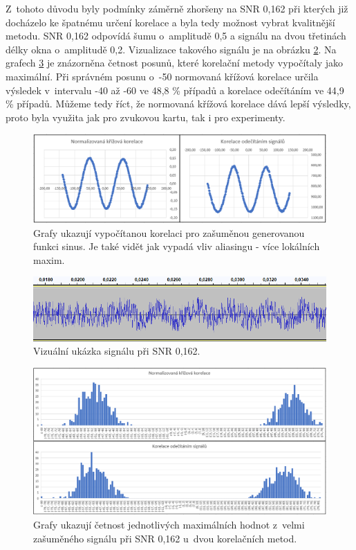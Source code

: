 Z~tohoto důvodu byly podmínky záměrně zhoršeny na SNR 0,162 při kterých již docházelo ke špatnému určení korelace a byla tedy možnost vybrat kvalitnější metodu. SNR 0,162 odpovídá šumu o~amplitudě 0,5 a signálu na dvou třetinách délky okna o~amplitudě 0,2. Vizualizace takového signálu je na obrázku \ref{pic:signalSNR01}. Na grafech \ref{pic:SNR01} je znázorněna četnost posunů, které korelační metody vypočítaly jako maximální. Při správném posunu o~-50 normovaná křížová korelace určila výsledek v~intervalu -40 až -60 ve 48,8 \% případů a korelace odečítáním ve 44,9 \% případů. Můžeme tedy říct, že normovaná křížová korelace dává lepší výsledky, proto byla využita jak pro zvukovou kartu, tak i pro experimenty.

\begin{figure}[hbt]
	\centering
	\includegraphics[width=1\textwidth]{obrazky-figures/korelSNR1.png}
	\caption{Grafy ukazují vypočítanou korelaci pro zašuměnou generovanou funkci sinus. Je také vidět jak vypadá vliv aliasingu - více lokálních maxim.}
	\label{pic:SNR1}
\end{figure}

\begin{figure}[hbt]
	\centering
	\includegraphics[width=1\textwidth]{obrazky-figures/signal_SNR016.png}
	\caption{Vizuální ukázka signálu při SNR 0,162.}
	\label{pic:signalSNR01}
\end{figure}

\begin{figure}[hbt]
	\centering
	\includegraphics[width=1\textwidth]{obrazky-figures/korelSNR01.png}
	\caption{Grafy ukazují četnost jednotlivých maximálních hodnot z~velmi zašuměného signálu při SNR 0,162 u~dvou korelačních metod.}
	\label{pic:SNR01}
\end{figure}

